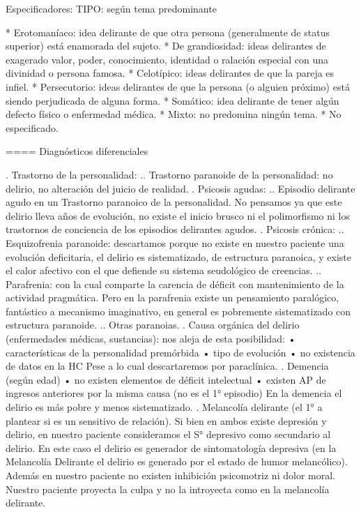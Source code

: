 Especificadores: TIPO: según tema predominante

* Erotomaníaco: idea delirante de que otra persona (generalmente de status superior) está enamorada del sujeto.
* De grandiosidad: ideas delirantes de exagerado valor, poder, conocimiento, identidad o ralación especial con una divinidad o persona famosa.
* Celotípico: ideas delirantes de que la pareja es infiel.
* Persecutorio: ideas delirantes de que la persona (o alguien próximo) está siendo perjudicada de alguna forma.
* Somático: idea delirante de tener algún defecto físico o enfermedad médica.
* Mixto: no predomina ningún tema.
* No especificado.

==== Diagnósticos diferenciales

. Trastorno de la personalidad:
.. Trastorno paranoide de la personalidad: no delirio, no alteración del juicio de realidad.
. Psicosis agudas:
.. Episodio delirante agudo en un Trastorno paranoico de la personalidad. No pensamos ya que este delirio lleva años de evolución, no existe el inicio brusco ni el polimorfismo ni los trastornos de conciencia de los episodios delirantes agudos.
. Psicosis crónica:
.. Esquizofrenia paranoide: descartamos porque no existe en nuestro paciente una evolución deficitaria, el delirio es sistematizado, de estructura paranoica, y existe el calor afectivo con el que defiende su sistema seudológico de creencias.
.. Parafrenia: con la cual comparte la carencia de déficit con mantenimiento de la actividad pragmática. Pero en la parafrenia existe un pensamiento paralógico, fantástico a mecanismo imaginativo, en general es pobremente sistematizado con estructura paranoide.
.. Otras paranoias.
. Causa orgánica del delirio (enfermedades médicas, sustancias): nos aleja de esta posibilidad: • características de la personalidad premórbida • tipo de evolución • no existencia de datos en la HC Pese a lo cual descartaremos por paraclínica.
. Demencia (según edad) • no existen elementos de déficit intelectual • existen AP de ingresos anteriores por la misma causa (no es el 1° episodio) En la demencia el delirio es más pobre y menos sistematizado.
. Melancolía delirante (el 1° a plantear si es un sensitivo de relación). Si bien en ambos existe depresión y delirio, en nuestro paciente consideramos el S° depresivo como secundario al delirio. En este caso el delirio es generador de sintomatología depresiva (en la Melancolía Delirante el delirio es generado por el estado de humor melancólico). Además en nuestro paciente no existen inhibición psicomotriz ni dolor moral. Nuestro paciente proyecta la culpa y no la introyecta como en la melancolía delirante.

